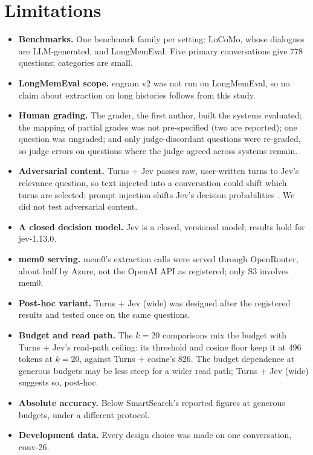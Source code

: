 \documentclass[11pt]{article}
\newcommand{\src}[1]{}
\begin{document}
\section*{Limitations}
\begin{itemize}
\item \textbf{Benchmarks.} One benchmark family per setting: LoCoMo, whose dialogues are LLM-generated, and LongMemEval. Five primary conversations give 778\src{bench/results/v3/batch\_b\_report.json\#H1/questions} questions; categories are small.
\item \textbf{LongMemEval scope.} engram v2 was not run on LongMemEval, so no claim about extraction on long histories follows from this study.
\item \textbf{Human grading.} The grader, the first author, built the systems evaluated; the mapping of partial grades was not pre-specified (two are reported); one question was ungraded; and only judge-discordant questions were re-graded, so judge errors on questions where the judge agreed across systems remain.
\item \textbf{Adversarial content.} Turns + Jev passes raw, user-written turns to Jev's relevance question, so text injected into a conversation could shift which turns are selected; prompt injection shifts Jev's decision probabilities \citep{wu2026hijacking}. We did not test adversarial content.
\item \textbf{A closed decision model.} Jev is a closed, versioned model; results hold for jev-1.13.0.
\item \textbf{mem0 serving.} mem0's extraction calls were served through OpenRouter, about half by Azure, not the OpenAI API as registered; only S3 involves mem0.
\item \textbf{Post-hoc variant.} Turns + Jev (wide) was designed after the registered results and tested once on the same questions.
\item \textbf{Budget and read path.} The $k{=}$20 comparisons mix the budget with Turns + Jev's read-path ceiling: its threshold and cosine floor keep it at 496\src{bench/results/v3/batch\_a\_report.json\#fresh/T0R k20/tokens\_mean} tokens at $k{=}$20, against Turns + cosine's 826\src{bench/results/v3/batch\_a\_report.json\#fresh/L0 k20/tokens\_mean}. The budget dependence at generous budgets may be less steep for a wider read path; Turns + Jev (wide) suggests so, post-hoc.
\item \textbf{Absolute accuracy.} Below SmartSearch's reported figures at generous budgets, under a different protocol.
\item \textbf{Development data.} Every design choice was made on one conversation, conv-26.
\end{itemize}
\end{document}
